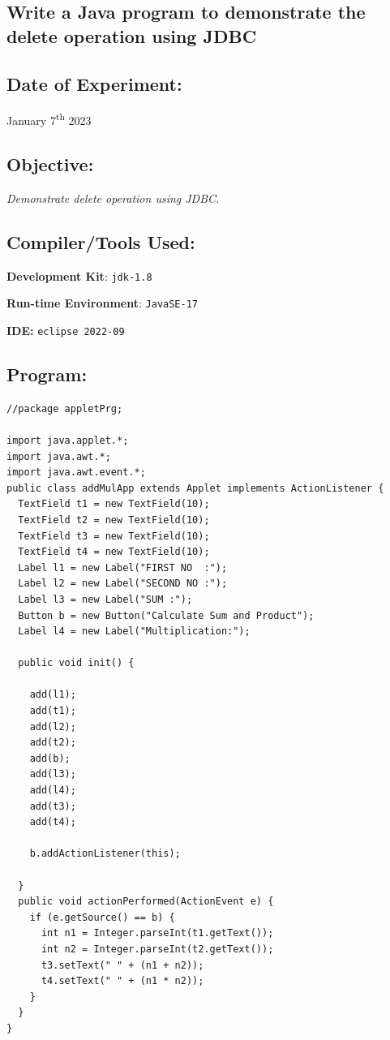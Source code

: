 \documentclass[12pt, a4paper]{article}
\begin{document}
\begin{tcolorbox}
  \section{Write a Java program to demonstrate the delete operation using JDBC}
\end{tcolorbox}

\subsection*{Date of Experiment:}
January 7\textsuperscript{th} 2023

\subsection*{Objective:}
\emph{\large{Demonstrate delete operation using JDBC.}}

\subsection*{Compiler/Tools Used:}
\textbf{Development Kit}: \verb+jdk-1.8+

\textbf{Run-time Environment}: \verb+JavaSE-17+

\textbf{IDE:} \verb+eclipse 2022-09+

\subsection*{Program:}
\begin{lstlisting}
//package appletPrg;

import java.applet.*;
import java.awt.*;
import java.awt.event.*;
public class addMulApp extends Applet implements ActionListener {
  TextField t1 = new TextField(10);
  TextField t2 = new TextField(10);
  TextField t3 = new TextField(10);
  TextField t4 = new TextField(10);
  Label l1 = new Label("FIRST NO  :");
  Label l2 = new Label("SECOND NO :");
  Label l3 = new Label("SUM :");
  Button b = new Button("Calculate Sum and Product");
  Label l4 = new Label("Multiplication:");

  public void init() {

    add(l1);
    add(t1);
    add(l2);
    add(t2);
    add(b);
    add(l3);
    add(l4);
    add(t3);
    add(t4);

    b.addActionListener(this);

  }
  public void actionPerformed(ActionEvent e) {
    if (e.getSource() == b) {
      int n1 = Integer.parseInt(t1.getText());
      int n2 = Integer.parseInt(t2.getText());
      t3.setText(" " + (n1 + n2));
      t4.setText(" " + (n1 * n2));
    }
  }
}
\end{lstlisting}
\end{document}
